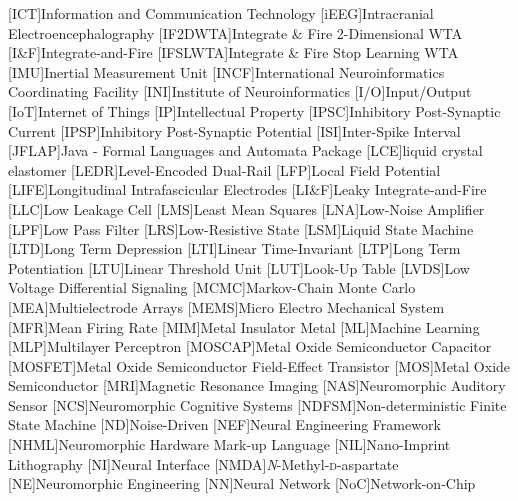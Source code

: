 [ICT]{Information and Communication Technology}
[iEEG]{Intracranial Electroencephalography}
[IF2DWTA]{Integrate \& Fire 2-Dimensional WTA}
[I\&F]{Integrate-and-Fire}
[IFSLWTA]{Integrate \& Fire Stop Learning WTA}
[IMU]{Inertial Measurement Unit}
[INCF]{International Neuroinformatics Coordinating Facility}
[INI]{Institute of Neuroinformatics}
[I/O]{Input/Output}
[IoT]{Internet of Things}
[IP]{Intellectual Property}
[IPSC]{Inhibitory Post-Synaptic Current}
[IPSP]{Inhibitory Post-Synaptic Potential}
[ISI]{Inter-Spike Interval}
[JFLAP]{Java - Formal Languages and Automata Package}
[LCE]{liquid crystal elastomer} 
[LEDR]{Level-Encoded Dual-Rail}
[LFP]{Local Field Potential}
[LIFE]{Longitudinal Intrafascicular Electrodes}
[LI\&F]{Leaky Integrate-and-Fire}
[LLC]{Low Leakage Cell}
[LMS]{Least Mean Squares}
[LNA]{Low-Noise Amplifier}
[LPF]{Low Pass Filter}
[LRS]{Low-Resistive State}
[LSM]{Liquid State Machine}
[LTD]{Long Term Depression}
[LTI]{Linear Time-Invariant}
[LTP]{Long Term Potentiation}
[LTU]{Linear Threshold Unit}
[LUT]{Look-Up Table}
[LVDS]{Low Voltage Differential Signaling}
[MCMC]{Markov-Chain Monte Carlo}
[MEA]{Multielectrode Arrays}
[MEMS]{Micro Electro Mechanical System}
[MFR]{Mean Firing Rate}
[MIM]{Metal Insulator Metal}
[ML]{Machine Learning}
[MLP]{Multilayer Perceptron}
[MOSCAP]{Metal Oxide Semiconductor Capacitor}
[MOSFET]{Metal Oxide Semiconductor Field-Effect Transistor}
[MOS]{Metal Oxide Semiconductor}
[MRI]{Magnetic Resonance Imaging}
[NAS]{Neuromorphic Auditory Sensor}
[NCS]{Neuromorphic Cognitive Systems}
[NDFSM]{Non-deterministic Finite State Machine} 
[ND]{Noise-Driven}
[NEF]{Neural Engineering Framework}
[NHML]{Neuromorphic Hardware Mark-up Language}
[NIL]{Nano-Imprint Lithography}
[NI]{Neural Interface}
[NMDA]{\textit{N}-Methyl-\textsc{d}-aspartate}
[NE]{Neuromorphic Engineering}
[NN]{Neural Network}
[NoC]{Network-on-Chip}
